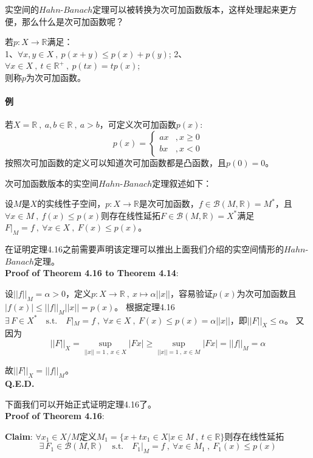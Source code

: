 实空间的$Hahn$-$Banach$定理可以被转换为次可加函数版本，这样处理起来更方便，那么什么是次可加函数呢？
\begin{definition}[次可加函数]
    若$p:X \to \mathbb{R}$满足：\\
    1、$\forall x,y \in X \ , \ p(x+y) \leq p(x) + p(y)$; 
    2、$\forall x \in X \ , \ t \in \mathbb{R}^+ \ , \ p(tx)=tp(x)$;\\
    则称$p$为次可加函数。
\end{definition}
\paragraph*{例} \quad 若$X=\mathbb{R} \ , \ a,b \in \mathbb{R} \ , \ a>b$，可定义次可加函数$p(x)$:
\[p(x)=\left\{\begin{array}{ll}
    ax & ,x \geq 0 \\
    bx & ,x<0    
\end{array}\right.\]
按照次可加函数的定义可以知道次可加函数都是凸函数，且$p(0)=0$。

次可加函数版本的实空间$Hahn$-$Banach$定理叙述如下：
\begin{theorem}[$Hahn$-$Banach$定理，$\mathbb{K}=\mathbb{R}$]
    设$M$是$X$的实线性子空间，$p:X \to \mathbb{R}$是次可加函数，$f \in \mathscr{B}(M,\mathbb{R})=M^*$，且$\forall x \in M \ , \ f(x) \leq p(x)$则存在线性延拓$F \in \mathscr{B}(M,\mathbb{R})=X^*$满足$F|_M=f \ , \ \forall x \in X \ , \ F(x) \leq p(x)$。
\end{theorem} 
在证明定理4.16之前需要声明该定理可以推出上面我们介绍的实空间情形的$Hahn$-$Banach$定理。\\
\textbf{Proof of Theorem 4.16 to Theorem 4.14}:

设$||f||_M=\alpha>0$，定义$p:X \to \mathbb{R} \ , \ x \mapsto \alpha||x||$，容易验证$p(x)$为次可加函数且$|f(x)| \leq ||f||_M||x||=p(x)$。
根据定理4.16$\exists \, F \in X^* \quad \text{s.t.} \quad F|_M=f \ , \ \forall x \in X \ , \ F(x) \leq p(x)=\alpha ||x||$，即$||F||_X \leq \alpha$。
又因为
\[||F||_X=\sup_{||x||=1 \ , \ x \in X}|Fx| \geq \sup_{||x||=1 \ , \ x \in M}|Fx|=||f||_M=\alpha\]

故$||F||_X=||f||_M$。\\
\textbf{Q.E.D.}

下面我们可以开始正式证明定理4.16了。\\
\textbf{Proof of Theorem 4.16}:

\textbf{Claim}: $\forall x_1 \in X/M$定义$M_1=\{x+tx_1 \in X|x \in M \ , \ t \in \mathbb{R}\}$则存在线性延拓
\[\exists \, F_1 \in \mathscr{B}(M,\mathbb{R}) \quad \text{s.t.} \quad F_1|_M=f \ , \ \forall x \in M_1 \ , \ F_1(x) \leq p(x)\]

